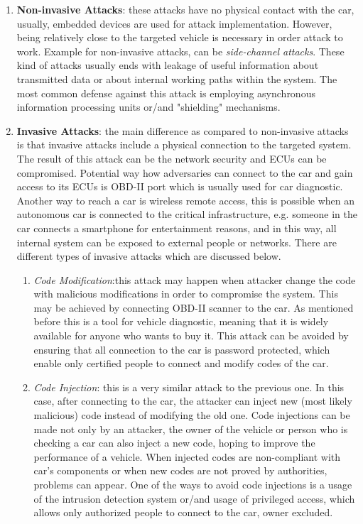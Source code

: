 \begin{enumerate}
	\item \textbf{Non-invasive Attacks}: these attacks have no physical contact with the car, usually, embedded devices are used for attack implementation. However, being relatively close to the targeted vehicle is necessary in order attack to work. Example for non-invasive attacks, can be \textit{side-channel attacks}. These kind of attacks usually ends with leakage of useful information about transmitted data or about internal working paths within the system. The most common defense against this attack is employing asynchronous information processing units or/and "shielding"	mechanisms.
	
	\item \textbf{Invasive Attacks}: the main difference as compared to non-invasive attacks is that invasive attacks include a physical connection to the targeted system. The result of this attack can be the network security and \glspl{ECU} can be compromised. Potential way how adversaries can connect to the car and gain access to its \glspl{ECU} is \gls{OBD-II} port which is usually used for car diagnostic. Another way to reach a car is wireless remote access, this is possible when an autonomous car is connected to the critical infrastructure, e.g. someone in the car connects a smartphone for entertainment reasons, and in this way, all internal system can be exposed to external people or networks. There are different types of invasive attacks which are discussed below.
	\begin{enumerate}
		\item \textit{Code Modification}:this attack may happen when attacker change the code with malicious modifications in order to compromise the system. This may be achieved by connecting \gls{OBD-II} scanner to the car. As mentioned before this is a tool for vehicle diagnostic, meaning that it is widely available for anyone who wants to buy it. This attack can be avoided by ensuring that all connection to the car is password protected, which enable only certified people to connect and modify codes of the car.
		\item \textit{Code Injection}: this is a very similar attack to the previous one. In this case, after connecting to the car, the attacker can inject new (most likely malicious) code instead of modifying the old one. Code injections can be made not only by an attacker, the owner of the vehicle or person who is checking a car can also inject a new code, hoping to improve the performance of a vehicle. When injected codes are non-compliant with car's components or when new codes are not proved by authorities, problems can appear. One of the ways to avoid code injections is a usage of the intrusion detection system or/and usage of privileged access, which allows only authorized people to connect to the car, owner excluded.

\end{enumerate}
\end{enumerate}
